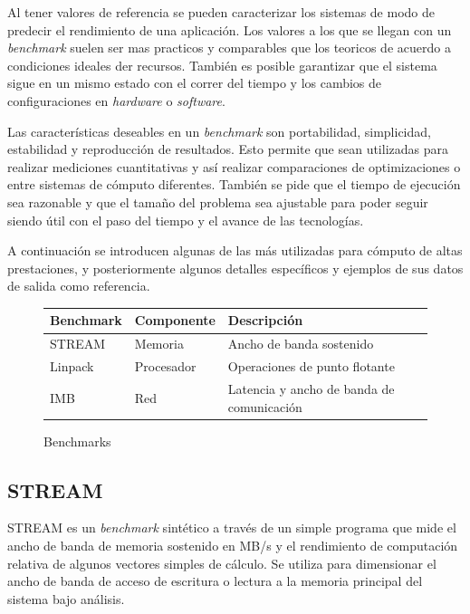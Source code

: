 \documentclass[a4paper]{report}
\begin{document}
\bigskip

Al tener valores de referencia se pueden caracterizar los sistemas de modo de predecir el rendimiento de una aplicaci\'on.
Los valores a los que se llegan con un {\it benchmark} suelen ser mas practicos y comparables que los teoricos de acuerdo a condiciones ideales der recursos.
Tambi\'en es posible garantizar que el sistema sigue en un mismo estado con el correr del tiempo y los cambios de configuraciones en {\it hardware} o {\it software}.

\bigskip

Las caracter\'isticas deseables en un {\it benchmark} son portabilidad, simplicidad, estabilidad y
reproducci\'on de resultados. Esto permite que sean utilizadas para realizar
mediciones cuantitativas y as\'i realizar comparaciones de optimizaciones o
entre sistemas de c\'omputo diferentes. Tambi\'en se pide que el tiempo de
ejecuci\'on sea razonable y que el tama\~no del problema sea ajustable para
poder seguir siendo \'util con el paso del tiempo y el avance de las
tecnolog\'ias.

\bigskip

A continuaci\'on se introducen algunas de las m\'as utilizadas para c\'omputo
de altas prestaciones, y posteriormente algunos detalles espec\'ificos y ejemplos de sus datos de salida como referencia.

\begin{figure}[H]
  \begin{center}
    \begin{tabular}{|l|l|l|}\hline
      {\bf Benchmark} & {\bf Componente} & {\bf Descripci\'on} \\ \hline
      STREAM & Memoria & Ancho de banda sostenido \\ \hline
      Linpack & Procesador & Operaciones de punto flotante \\ \hline
      IMB & Red & Latencia y ancho de banda de comunicaci\'on \\ \hline
    \end{tabular}
    \caption{Benchmarks}
  \end{center}
  \label{benchmark-list}
\end{figure}

\subsection{STREAM}

STREAM \cite{stream} es un {\it benchmark} sint\'etico a trav\'es de un simple
programa que mide el ancho de banda de memoria sostenido en MB/s y el
rendimiento de computaci\'on relativa de algunos vectores simples de c\'alculo.
Se utiliza para dimensionar el ancho de banda de acceso de escritura o lectura
a la memoria principal del sistema bajo an\'alisis.
\end{document}
